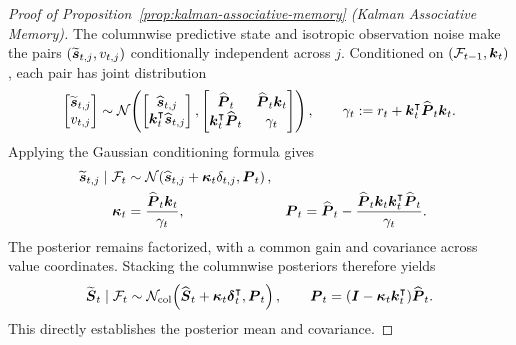 \documentclass{article} %
\begin{document}
\begin{proof}[Proof of Proposition~\ref{prop:kalman-associative-memory} (Kalman Associative Memory)]
The columnwise predictive state and isotropic observation noise make the pairs
$(\widetilde{\boldsymbol{s}}_{t,j},v_{t,j})$ conditionally independent across $j$. Conditioned on
$(\mathcal F_{t-1},\boldsymbol{k}_t)$, each pair has joint distribution
\begin{equation}
  \begin{bmatrix}
    \widetilde{\boldsymbol{s}}_{t,j} \\ v_{t,j}
  \end{bmatrix}
  \sim
  \mathcal N\!\left(
  \begin{bmatrix}
    \widehat{\boldsymbol{s}}_{t,j} \\ \boldsymbol{k}_t^{\intercal}\widehat{\boldsymbol{s}}_{t,j}
  \end{bmatrix},
  \begin{bmatrix}
    \widehat{\boldsymbol{P}}_t & \widehat{\boldsymbol{P}}_t\boldsymbol{k}_t \\
    \boldsymbol{k}_t^{\intercal}\widehat{\boldsymbol{P}}_t & \gamma_t
  \end{bmatrix}
  \right),
  \qquad
  \gamma_t:=r_t+\boldsymbol{k}_t^{\intercal}\widehat{\boldsymbol{P}}_t\boldsymbol{k}_t.
  \label{eq:kam-joint-column}
\end{equation}
Applying the Gaussian conditioning formula gives
\begin{equation}
\begin{aligned}
  \widetilde{\boldsymbol{s}}_{t,j}\mid\mathcal F_t
  &\sim
  \mathcal N\!\left(
    \widehat{\boldsymbol{s}}_{t,j}+\boldsymbol{\kappa}_t\delta_{t,j},
    \boldsymbol{P}_t
  \right), \\
  \boldsymbol{\kappa}_t
  &=\frac{\widehat{\boldsymbol{P}}_t\boldsymbol{k}_t}{\gamma_t},
  &
  \boldsymbol{P}_t
  &=\widehat{\boldsymbol{P}}_t
    -\frac{\widehat{\boldsymbol{P}}_t\boldsymbol{k}_t\boldsymbol{k}_t^{\intercal}\widehat{\boldsymbol{P}}_t}
    {\gamma_t}.
\end{aligned}
  \label{eq:kam-column-conditioning}
\end{equation}
The posterior remains factorized, with a common gain and covariance across value coordinates.
Stacking the columnwise posteriors therefore yields
\begin{equation}
  \widetilde{\boldsymbol{S}}_t\mid\mathcal F_t
  \sim
  \mathcal N_{\mathrm{col}}\!\left(
    \widehat{\boldsymbol{S}}_t+\boldsymbol{\kappa}_t\boldsymbol{\delta}_t^{\intercal},
    \boldsymbol{P}_t
  \right),
  \qquad
  \boldsymbol{P}_t
  =(\boldsymbol{I}-\boldsymbol{\kappa}_t\boldsymbol{k}_t^{\intercal})\widehat{\boldsymbol{P}}_t.
  \label{eq:kam-stacked-posterior}
\end{equation}
This directly establishes the posterior mean and covariance.


\end{proof}
\end{document}
